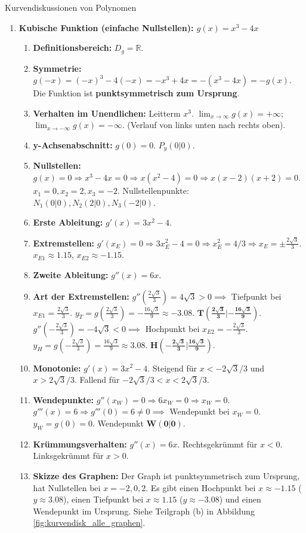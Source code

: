 \begin{loesungsumgebung}{Kurvendiskussionen von Polynomen}
\begin{enumerate}[label=(\alph*)]
    \item \textbf{Kubische Funktion (einfache Nullstellen): $g(x) = x^3 - 4x$}
    \begin{enumerate}[label=\arabic*.]
        \item \textbf{Definitionsbereich:} $D_g = \mathbb{R}$.
        \item \textbf{Symmetrie:} $g(-x) = (-x)^3 - 4(-x) = -x^3 + 4x = -(x^3-4x) = -g(x)$.
        Die Funktion ist \textbf{punktsymmetrisch zum Ursprung}.
        \item \textbf{Verhalten im Unendlichen:} Leitterm $x^3$.
        $\lim_{x \to \infty} g(x) = +\infty$; $\lim_{x \to -\infty} g(x) = -\infty$. (Verlauf von links unten nach rechts oben).
        \item \textbf{y-Achsenabschnitt:} $g(0) = 0$. $P_y(0|0)$.
        \item \textbf{Nullstellen:} $g(x)=0 \Rightarrow x^3 - 4x = 0 \Rightarrow x(x^2-4) = 0 \Rightarrow x(x-2)(x+2)=0$.
        $x_1=0, x_2=2, x_3=-2$. Nullstellenpunkte: $N_1(0|0), N_2(2|0), N_3(-2|0)$.
        \item \textbf{Erste Ableitung:} $g'(x) = 3x^2 - 4$.
        \item \textbf{Extremstellen:} $g'(x_E)=0 \Rightarrow 3x_E^2 - 4 = 0 \Rightarrow x_E^2 = 4/3 \Rightarrow x_E = \pm \frac{2\sqrt{3}}{3}$.
        $x_{E1} \approx 1.15$, $x_{E2} \approx -1.15$.
        \item \textbf{Zweite Ableitung:} $g''(x) = 6x$.
        \item \textbf{Art der Extremstellen:}
        $g''(\frac{2\sqrt{3}}{3}) = 4\sqrt{3} > 0 \implies$ Tiefpunkt bei $x_{E1}=\frac{2\sqrt{3}}{3}$.
        $y_T = g(\frac{2\sqrt{3}}{3}) = -\frac{16\sqrt{3}}{9} \approx -3.08$. $\mathbf{T(\frac{2\sqrt{3}}{3}|-\frac{16\sqrt{3}}{9})}$.
        $g''(-\frac{2\sqrt{3}}{3}) = -4\sqrt{3} < 0 \implies$ Hochpunkt bei $x_{E2}=-\frac{2\sqrt{3}}{3}$.
        $y_H = g(-\frac{2\sqrt{3}}{3}) = \frac{16\sqrt{3}}{9} \approx 3.08$. $\mathbf{H(-\frac{2\sqrt{3}}{3}|\frac{16\sqrt{3}}{9})}$.
        \item \textbf{Monotonie:} $g'(x) = 3x^2-4$. Steigend für $x < -2\sqrt{3}/3$ und $x > 2\sqrt{3}/3$. Fallend für $-2\sqrt{3}/3 < x < 2\sqrt{3}/3$.
        \item \textbf{Wendepunkte:} $g''(x_W)=0 \Rightarrow 6x_W=0 \Rightarrow x_W=0$.
        $g'''(x)=6 \Rightarrow g'''(0)=6 \neq 0 \implies$ Wendepunkt bei $x_W=0$.
        $y_W = g(0)=0$. Wendepunkt $\mathbf{W(0|0)}$.
        \item \textbf{Krümmungsverhalten:} $g''(x)=6x$. Rechtsgekrümmt für $x < 0$. Linksgekrümmt für $x > 0$.
        \item \textbf{Skizze des Graphen:} Der Graph ist punktsymmetrisch zum Ursprung, hat Nullstellen bei $x=-2, 0, 2$. Es gibt einen Hochpunkt bei $x \approx -1.15$ ($y \approx 3.08$), einen Tiefpunkt bei $x \approx 1.15$ ($y \approx -3.08$) und einen Wendepunkt im Ursprung. Siehe Teilgraph (b) in Abbildung \ref{fig:kurvendisk_alle_graphen}.
    \end{enumerate}


\end{enumerate}
\end{loesungsumgebung}
